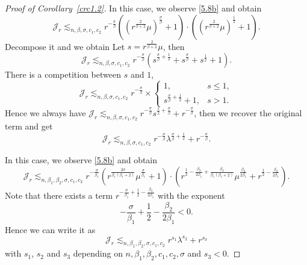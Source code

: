 \documentclass{article}
\numberwithin{equation}{section}
\numberwithin{equation}{section}
\theoremstyle{definition}
\begin{document}
\begin{proof}[Proof of Corollary~\ref{crc1.2}]
In this case, we observe \eqref{5.8b} and obtain
\begin{equation}
	\mathcal{J}_r\lesssim_{n,\beta,\sigma ,c_1,c_2} r^{-\frac{\sigma }{\beta}}\left( \left(r^{\frac{2}{\beta +2}}\mu\right)^{\frac{\sigma }{\beta}}+1 \right) \!\cdot \!\left(\left( r^{\frac{2}{\beta +2}}\mu\right)^{\frac{1}{2}}+1 \right). 
\end{equation}
Decompose it and we obtain
Let $s=r^{\frac{2}{\beta +2}}\mu$, then
\begin{equation}
	\mathcal{J}_r\lesssim_{n,\beta,\sigma ,c_1,c_2} r^{-\frac{\sigma }{\beta}}\left( s^{\frac{\sigma }{ \beta}+\frac{1}{2}}+s^{\frac{\sigma }{\beta}} +s^{\frac{1}{2}}+1\right).
\end{equation}
There is a competition between $s$ and $1$,
\begin{equation}
	\mathcal{J}_r\lesssim_{n,\beta,\sigma ,c_1,c_2}r^{-\frac{\sigma }{\beta}}\times \begin{cases}
		1,&s\le 1,\\
		s^{\frac{\sigma }{\beta}+\frac{1}{2}}+1,&s>1.
	\end{cases}
\end{equation}
Hence we always have $\mathcal{J}_r\lesssim_{n,\beta,\sigma ,c_1,c_2}r^{-\frac{\sigma }{\beta}} s^{\frac{1}{2}+\frac{\sigma }{\beta}}+r^{-\frac{\sigma }{\beta}}$, then we recover the original term and get
\begin{equation}
	\mathcal{J}_r\lesssim_{n,\beta,\sigma ,c_1,c_2}r^{-\frac{\sigma }{\beta}}\lambda^{\frac{\sigma }{\beta}+\frac{1}{2}}+r^{-\frac{\sigma }{\beta}}.
\end{equation}


In this case, we observe \eqref{5.8b} and obtain
\begin{equation}\label{5.18d}
	\mathcal{J}_r\lesssim_{n,\beta_1,\beta_2,\sigma,c_1,c_2}r^{-\frac{\sigma }{\beta_1}}\left( r^{\frac{2\sigma }{\beta_1(\beta_1+2)}}\mu^{\frac{\sigma }{\beta_1}}+ 1 \right)\!\cdot \!\left( r^{\frac{1}{2}-\frac{\beta_2}{2\beta_1}+\frac{\beta_2}{\beta_1(\beta_1+2)}}\mu^{\frac{\beta_2}{2\beta_1}}+r^{\frac{1}{2}-\frac{\beta_2}{2\beta_1}} \right).  
\end{equation}
Note that there exists a term $r^{-\frac{\sigma }{\beta_1}+\frac{1}{2}-\frac{\beta_2}{2\beta_1}}$ with the exponent  
\[
-\frac{\sigma }{\beta_1}+\frac{1}{2}-\frac{\beta_2}{2\beta_1}<0.
\]
Hence we can write it as
\[
\mathcal{J}_r\lesssim_{n,\beta_1,\beta_2,\sigma,c_1,c_2} r^{s_1}\lambda^{s_2}+r^{s_3}
\] 
with $s_1$, $s_2$ and $s_3$ depending on $n,\beta_1,\beta_2,c_1,c_2,\sigma $ and $s_3<0$.
\end{proof}
\end{document}
